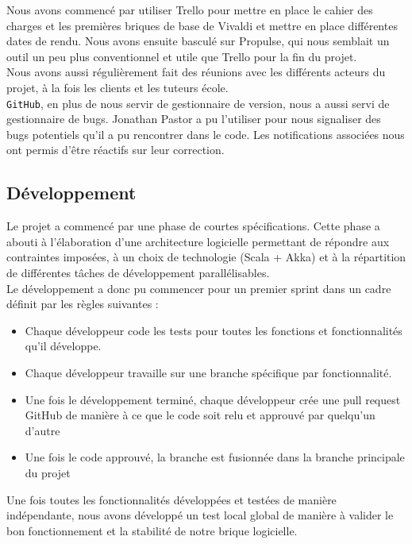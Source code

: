 \documentclass[11pt,a4paper]{article}
\begin{document}
Nous avons commencé par utiliser Trello pour mettre en place le cahier des charges et les premières briques de base de Vivaldi et mettre en place différentes dates de rendu. Nous avons ensuite basculé sur Propulse, qui nous semblait un outil un peu plus conventionnel et utile que Trello pour la fin du projet.\\

Nous avons aussi régulièrement fait des réunions avec les différents acteurs du projet, à la fois les clients et les tuteurs école.\\

\texttt{GitHub}, en plus de nous servir de gestionnaire de version, nous a aussi servi de gestionnaire de bugs. Jonathan Pastor a pu l'utiliser pour nous signaliser des bugs potentiels qu'il a pu rencontrer dans le code. Les notifications associées nous ont permis d'être réactifs sur leur correction.

\subsection{Développement}
\label{subsec:dev}
Le projet a commencé par une phase de courtes spécifications. Cette phase a abouti à l'élaboration d'une architecture logicielle permettant de répondre aux contraintes imposées, à un choix de technologie (Scala + Akka) et à la répartition de différentes tâches de développement parallélisables. \\

Le développement a donc pu commencer pour un premier sprint dans un cadre définit par les règles suivantes :

\begin{itemize}
\item Chaque développeur code les tests pour toutes les fonctions et fonctionnalités qu'il développe.
\item Chaque développeur travaille sur une branche spécifique par fonctionnalité.
\item Une fois le développement terminé, chaque développeur crée une pull request GitHub de manière à ce que le code soit relu et approuvé par quelqu'un d'autre
\item Une fois le code approuvé, la branche est fusionnée dans la branche principale du projet
\end{itemize}

Une fois toutes les fonctionnalités développées et testées de manière indépendante, nous avons développé un test local global de manière à valider le bon fonctionnement et la stabilité de notre brique logicielle.\\
\end{document}

